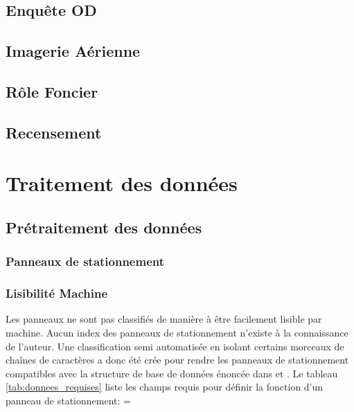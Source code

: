   \subsection{Enquête OD}
  \subsection{Imagerie Aérienne}
  \subsection{Rôle Foncier}
  \subsection{Recensement}
\section{Traitement des données}
  \subsection{Prétraitement des données}
    \subsubsection{Panneaux de stationnement}
      \subsubsection{Lisibilité Machine}
        Les panneaux ne sont pas classifiés de manière à être facilement lisible par machine. Aucun index des panneaux de stationnement n'existe à la connaissance de l'auteur. Une classification semi automatisée en isolant certains morceaux de chaînes de caractères a donc été crée pour rendre les panneaux de stationnement compatibles avec la structure de base de données énoncée dans \textcite{Bourdeau:MethodologieAnalyse:2014} et \textcite{Morency:DeveloppementMise:2022}. Le tableau \ref{tab:donnees_requises} liste les champs requis pour définir la fonction d'un panneau de stationnement:
        \LTcapwidth=\textwidth

